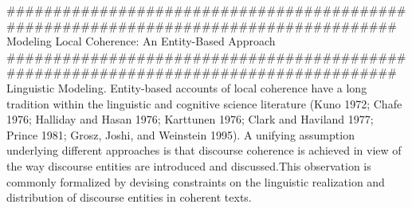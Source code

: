%
%
%
%
%
%
#####################################################################################
\cite{Barzilay} Modeling Local Coherence: An Entity-Based Approach
#####################################################################################
Linguistic Modeling.
Entity-based accounts of local coherence have a long tradition
within the linguistic and cognitive science literature (Kuno 1972; Chafe 1976; Halliday
and Hasan 1976; Karttunen 1976; Clark and Haviland 1977; Prince 1981; Grosz, Joshi,
and Weinstein 1995). A unifying assumption underlying different approaches is that
discourse coherence is achieved in view of the way discourse entities are introduced
and discussed.This observation is commonly formalized by devising constraints on the
linguistic realization and distribution of discourse entities in coherent texts.

